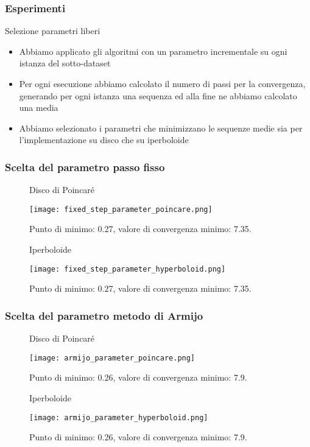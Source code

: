 \documentclass{beamer}
\begin{document}
\begin{frame}
\frametitle{Esperimenti}
\begin{beamerboxesrounded}{Selezione parametri liberi}
\begin{itemize}
    \item Abbiamo applicato gli algoritmi con un parametro incrementale su ogni istanza del sotto-dataset
    \item Per ogni esecuzione abbiamo calcolato il numero di passi per la convergenza, generando per ogni istanza una sequenza ed alla fine ne abbiamo calcolato una media
    \item Abbiamo selezionato i parametri che minimizzano le sequenze medie sia per l’implementazione su disco che su iperboloide
\end{itemize}
\end{beamerboxesrounded}
\end{frame}

\begin{frame}
\frametitle{Scelta del parametro passo fisso}
\begin{figure}[ht]
    \begin{minipage}[b]{0.45\linewidth}
        \centering
        Disco di Poincaré\par\medskip
        \texttt{[image: fixed\_step\_parameter\_poincare.png]}
        \caption{Punto di minimo: 0.27, valore di convergenza minimo: 7.35.}
    \end{minipage}
    \hspace{0.5cm}
    \begin{minipage}[b]{0.45\linewidth}
        \centering
        Iperboloide\par\medskip
        \texttt{[image: fixed\_step\_parameter\_hyperboloid.png]}
        \caption{Punto di minimo: 0.27, valore di convergenza minimo: 7.35.}
    \end{minipage}
\end{figure}
\end{frame}

\begin{frame}
\frametitle{Scelta del parametro metodo di Armijo}
\begin{figure}[ht]
    \begin{minipage}[b]{0.45\linewidth}
        \centering
        Disco di Poincaré\par\medskip
        \texttt{[image: armijo\_parameter\_poincare.png]}
        \caption{Punto di minimo: 0.26, valore di convergenza minimo: 7.9.}
    \end{minipage}
    \hspace{0.5cm}
    \begin{minipage}[b]{0.45\linewidth}
        \centering
        Iperboloide\par\medskip
        \texttt{[image: armijo\_parameter\_hyperboloid.png]}
        \caption{Punto di minimo: 0.26, valore di convergenza minimo: 7.9.}
    \end{minipage}
\end{figure}
\end{frame}
\end{document}
